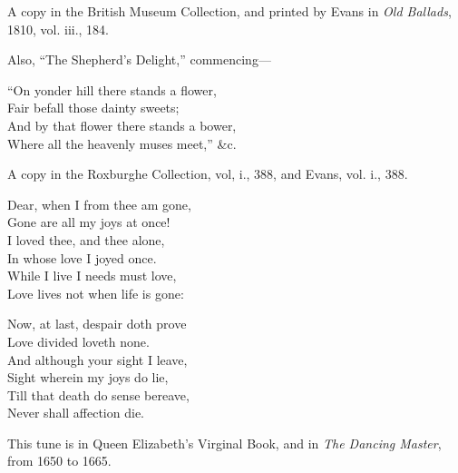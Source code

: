 A copy in the British Museum Collection, and printed by Evans in \textit{Old Ballads},
1810, vol. iii., 184.

Also, “The Shepherd’s Delight,” commencing—
\settowidth{\versewidth}{And by that flower there stands a bower,}
\begin{scverse}
\begin{altverse}
“On yonder hill there stands a flower,\\
Fair befall those dainty sweets;\\
And by that flower there stands a bower,\\
Where all the heavenly muses meet,” \&c.
\end{altverse}
\end{scverse}

A copy in the Roxburghe Collection, vol, i., 388, and Evans, vol. i., 388.




\settowidth{\versewidth}{Dear, when I from thee am gone,}
\begin{dcverse}
\begin{altverse}
Dear, when I from thee am gone,\\
Gone are all my joys at once!\\
I loved thee, and thee alone,\\
In whose love I joyed once.\\
While I live I needs must love,\\
Love lives not when life is gone:
\end{altverse}

\begin{altverse}
Now, at last, despair doth prove\\
Love divided loveth none.\\
And although your sight I leave,\\
Sight wherein my joys do lie,\\
Till that death do sense bereave,\\
Never shall affection die.
\end{altverse}
\end{dcverse}
\pagebreak


This tune is in Queen Elizabeth’s Virginal Book, and in \textit{The Dancing Master},
from 1650 to 1665.

